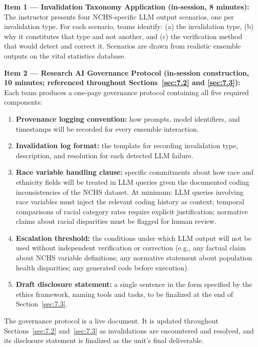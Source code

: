 \textbf{Item 1 --- Invalidation Taxonomy Application (in-session,
8 minutes):}
The instructor presents four NCHS-specific LLM output scenarios,
one per invalidation type. For each scenario, teams identify:
(a) the invalidation type, (b) why it constitutes that type and
not another, and (c) the verification method that would detect
and correct it. Scenarios are drawn from realistic ensemble
outputs on the vital statistics database.

\textbf{Item 2 --- Research AI Governance Protocol
(in-session construction, 10 minutes; referenced throughout
Sections~\ref{sec:7.2} and \ref{sec:7.3}):}
Each team produces a one-page governance protocol containing
all five required components:
\begin{enumerate}
    \item \textbf{Provenance logging convention:} how prompts,
    model identifiers, and timestamps will be recorded for every
    ensemble interaction.

    \item \textbf{Invalidation log format:} the template for
    recording invalidation type, description, and resolution for
    each detected LLM failure.

    \item \textbf{Race variable handling clause:} specific
    commitments about how race and ethnicity fields will be
    treated in LLM queries given the documented coding
    inconsistencies of the NCHS dataset. At minimum: LLM queries
    involving race variables must inject the relevant coding
    history as context; temporal comparisons of racial category
    rates require explicit justification; normative claims about
    racial disparities must be flagged for human review.

    \item \textbf{Escalation threshold:} the conditions under
    which LLM output will not be used without independent
    verification or correction (e.g., any factual claim about
    NCHS variable definitions; any normative statement about
    population health disparities; any generated code before
    execution).

    \item \textbf{Draft disclosure statement:} a single sentence
    in the form specified by the ethics framework, naming tools
    and tasks, to be finalized at the end of Section~\ref{sec:7.3}.
\end{enumerate}

The governance protocol is a live document. It is updated
throughout Sections~\ref{sec:7.2} and~\ref{sec:7.3} as
invalidations are encountered and resolved, and its disclosure
statement is finalized as the unit's final deliverable.


